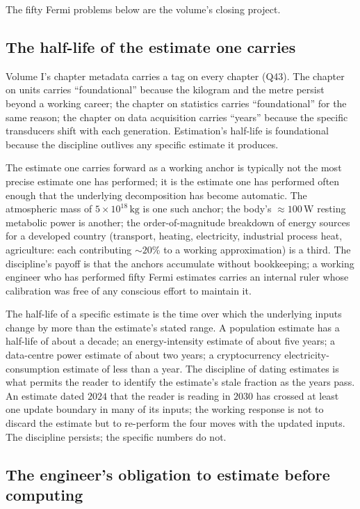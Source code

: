 The fifty Fermi problems below are the volume's closing project.

\subsection{The half-life of the estimate one carries}

Volume I's chapter metadata carries a  tag on
every chapter (Q43). The chapter on units carries
``foundational'' because the kilogram and the metre persist
beyond a working career; the chapter on statistics carries
``foundational'' for the same reason; the chapter on data
acquisition carries ``years'' because the specific transducers
shift with each generation. Estimation's half-life is
foundational because the discipline outlives any specific
estimate it produces.

The estimate one carries forward as a working anchor is
typically not the most precise estimate one has performed; it
is the estimate one has performed often enough that the
underlying decomposition has become automatic. The atmospheric
mass of $5 \times 10^{18} \,\si{\kilo\gram}$ is one such
anchor; the body's $\approx 100 \,\si{\watt}$ resting metabolic
power is another; the order-of-magnitude breakdown of energy
sources for a developed country (transport, heating,
electricity, industrial process heat, agriculture: each
contributing $\sim 20\%$ to a working approximation) is a
third. The discipline's payoff is that the anchors accumulate
without bookkeeping; a working engineer who has performed
fifty Fermi estimates carries an internal ruler whose
calibration was free of any conscious effort to maintain it.

The half-life of a specific estimate is the time over which
the underlying inputs change by more than the estimate's
stated range. A population estimate has a half-life of about a
decade; an energy-intensity estimate of about five years; a
data-centre power estimate of about two years; a cryptocurrency
electricity-consumption estimate of less than a year. The
discipline of dating estimates is what permits the reader to
identify the estimate's stale fraction as the years pass. An
estimate dated $2024$ that the reader is reading in $2030$ has
crossed at least one update boundary in many of its inputs;
the working response is not to discard the estimate but to
re-perform the four moves with the updated inputs. The
discipline persists; the specific numbers do not.

\subsection{The engineer's obligation to estimate before
computing}

